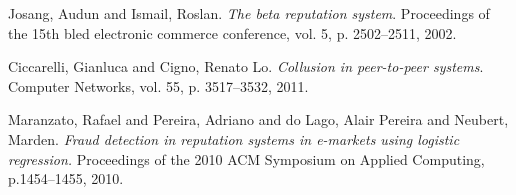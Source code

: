 \documentclass[11pt]{article}
\begin{document}
\begin{thebibliography}{1}
 
Josang, Audun and Ismail, Roslan. 
\textit{The beta reputation system}.
Proceedings of the 15th bled electronic commerce conference, vol. 5, p. 2502--2511, 2002.

Ciccarelli, Gianluca and Cigno, Renato Lo.
\textit{Collusion in peer-to-peer systems}.
Computer Networks, vol. 55, p. 3517--3532, 2011.

Maranzato, Rafael and Pereira, Adriano and do Lago, Alair Pereira and Neubert, Marden.
\textit{Fraud detection in reputation systems in e-markets using logistic regression.}
Proceedings of the 2010 ACM Symposium on Applied Computing, p.1454--1455, 2010.

\end{thebibliography}
\end{document}
